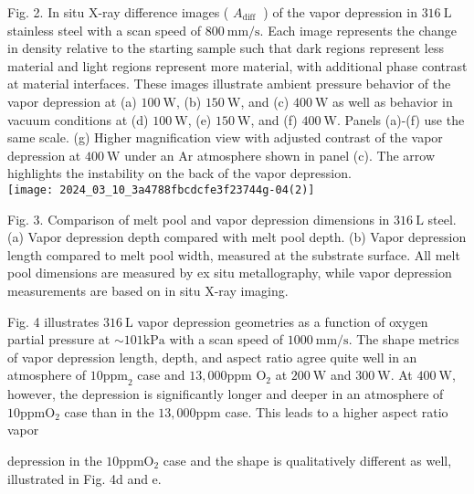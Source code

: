\documentclass[10pt]{article}
\begin{document}
Fig. 2. In situ X-ray difference images ( $A_{\text {diff }}$ ) of the vapor depression in $316 \mathrm{~L}$ stainless steel with a scan speed of $800 \mathrm{~mm} / \mathrm{s}$. Each image represents the change in density relative to the starting sample such that dark regions represent less material and light regions represent more material, with additional phase contrast at material interfaces. These images illustrate ambient pressure behavior of the vapor depression at (a) $100 \mathrm{~W}$, (b) $150 \mathrm{~W}$, and (c) $400 \mathrm{~W}$ as well as behavior in vacuum conditions at (d) $100 \mathrm{~W}$, (e) $150 \mathrm{~W}$, and (f) $400 \mathrm{~W}$. Panels (a)-(f) use the same scale. (g) Higher magnification view with adjusted contrast of the vapor depression at $400 \mathrm{~W}$ under an $\mathrm{Ar}$ atmosphere shown in panel (c). The arrow highlights the instability on the back of the vapor depression.\\
\texttt{[image: 2024\_03\_10\_3a4788fbcdcfe3f23744g-04(2)]}

Fig. 3. Comparison of melt pool and vapor depression dimensions in $316 \mathrm{~L}$ steel. (a) Vapor depression depth compared with melt pool depth. (b) Vapor depression length compared to melt pool width, measured at the substrate surface. All melt pool dimensions are measured by ex situ metallography, while vapor depression measurements are based on in situ X-ray imaging.

Fig. 4 illustrates $316 \mathrm{~L}$ vapor depression geometries as a function of oxygen partial pressure at $\sim 101 \mathrm{kPa}$ with a scan speed of $1000 \mathrm{~mm} / \mathrm{s}$. The shape metrics of vapor depression length, depth, and aspect ratio agree quite well in an atmosphere of $10 \mathrm{ppm}_{2}$ case and $13,000 \mathrm{ppm}$ $\mathrm{O}_{2}$ at $200 \mathrm{~W}$ and $300 \mathrm{~W}$. At $400 \mathrm{~W}$, however, the depression is significantly longer and deeper in an atmosphere of $10 \mathrm{ppm} \mathrm{O}_{2}$ case than in the $13,000 \mathrm{ppm}$ case. This leads to a higher aspect ratio vapor

depression in the $10 \mathrm{ppm} \mathrm{O}_{2}$ case and the shape is qualitatively different as well, illustrated in Fig. 4d and e.
\end{document}
